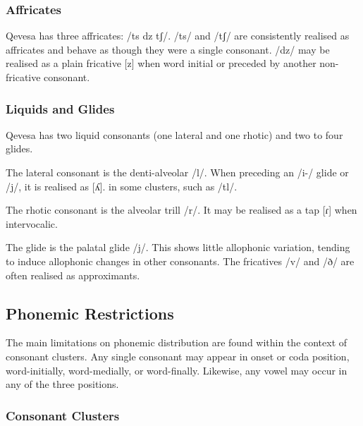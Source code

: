 \documentclass[grammar]{subfiles}
\begin{document}
  \subsubsection{Affricates}
  \label{sssec:affricates}

  Qevesa has three affricates: /ts dz tʃ/.  /ts/ and /tʃ/ are consistently
  realised as affricates and behave as though they were a single consonant.
  /dz/ may be realised as a plain fricative [z] when word initial or preceded
  by another non-fricative consonant.


  \subsubsection{Liquids and Glides}
  \label{sssec:liquids}

  Qevesa has two liquid consonants (one lateral and one rhotic) and two to four glides.

  The lateral consonant is the denti-alveolar /l/.  When preceding an /i-/ glide
  or /j/, it is realised as [ʎ].  %
  in some clusters, such as /tl/.

  The rhotic consonant is the alveolar trill /r/.  It may be realised as a tap
  [ɾ] when intervocalic.  

  The glide is the palatal glide /j/.  This shows little allophonic variation,
  tending to induce allophonic changes in other consonants.  The fricatives /v/
  and /ð/ are often realised as approximants.  

  \subsection{Phonemic Restrictions}
  \label{ssec:phonemic_restrictions}

  The main limitations on phonemic distribution are found within the context of
  consonant clusters.  Any single consonant may appear in onset or coda
  position, word-initially, word-medially, or word-finally.  Likewise, any
  vowel may occur in any of the three positions. 

  \subsubsection{Consonant Clusters}
  \label{sssec:consonant_clusters}
\end{document}
